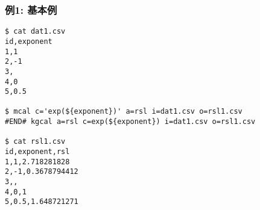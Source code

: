 
\subsubsection*{例1: 基本例}


\begin{Verbatim}[baselinestretch=0.7,frame=single]
$ cat dat1.csv
id,exponent
1,1
2,-1
3,
4,0
5,0.5

$ mcal c='exp(${exponent})' a=rsl i=dat1.csv o=rsl1.csv
#END# kgcal a=rsl c=exp(${exponent}) i=dat1.csv o=rsl1.csv

$ cat rsl1.csv
id,exponent,rsl
1,1,2.718281828
2,-1,0.3678794412
3,,
4,0,1
5,0.5,1.648721271
\end{Verbatim}
